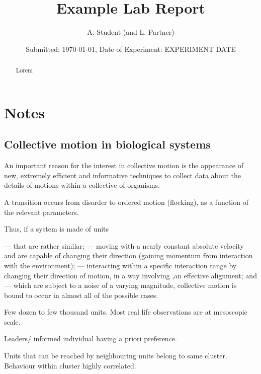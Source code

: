 \documentclass[10pt,twocolumn]{revtex4-2}    %
\begin{document}
\title{Example Lab Report} 
\date{Submitted: \today{}, Date of Experiment: EXPERIMENT DATE}
\author{A. Student (and L. Partner)}


\begin{abstract}              
 
Lorem

\end{abstract}

\maketitle

\thispagestyle{plain} %


\section{Notes}

\subsection{Collective motion in biological systems}

An important reason for the interest in collective motion is the appearance of new, extremely efficient and informative techniques to collect data about the details of motions within a collective of organisms.

A transition occurs from disorder to ordered motion (flocking), as a function of the relevant parameters. 

Thus, if a system is made of units

— that are rather similar;
— moving with a nearly constant absolute velocity and are capable of changing their direction (gaining momentum from interaction with the environment);
— interacting within a speciﬁc interaction range by changing their direction of motion, in a way involving ,an effective alignment; and
— which are subject to a noise of a varying magnitude,
collective motion is bound to occur in almost all of the possible cases.

Few dozen to few thousand units. Most real life observations are at mesoscopic scale.

Leaders/ informed individual having a priori preference. 

Units that can be reached by neighbouring units belong to same cluster. Behaviour within cluster highly correlated. 
\end{document}
